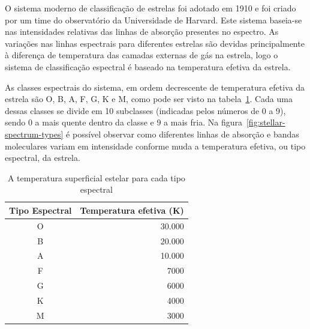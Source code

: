 O sistema moderno de classificação de estrelas foi adotado em 1910 e foi criado por um time do observatório da Universidade de Harvard. Este sistema baseia-se nas intensidades relativas das linhas de absorção presentes no espectro. As variações nas linhas espectrais para diferentes estrelas são devidas principalmente à diferença de temperatura das camadas externas de gás na estrela, logo o sistema de classificação espectral é baseado na temperatura efetiva da estrela. 

As classes espectrais do sistema, em ordem decrescente de temperatura efetiva da estrela são O, B, A, F, G, K e M, como pode ser visto na tabela~\ref{tab:stellar-temperatures}. Cada uma dessas classes se divide em 10 subclasses (indicadas pelos números de 0 a 9), sendo 0 a mais quente dentro da classe e 9 a mais fria.
Na figura~\ref{fig:stellar-spectrum-types} é possível observar como diferentes linhas de absorção e bandas moleculares variam em intensidade conforme muda a temperatura efetiva, ou tipo espectral, da estrela.

\begin{table}[htb]
\centering
\begin{tabular}{|c|r|}
\hline
\textbf{Tipo Espectral} & \textbf{Temperatura efetiva (K)} \\ \hline
O                       & 30.000                               \\ \hline
B                       & 20.000                               \\ \hline
A                       & 10.000                               \\ \hline
F                       & 7000                                 \\ \hline
G                       & 6000                                 \\ \hline
K                       & 4000                                 \\ \hline
M                       & 3000                                 \\ \hline
\end{tabular}
\caption{A temperatura superficial estelar para cada tipo espectral \citep{iag-stellar-temps}}\label{tab:stellar-temperatures}
\end{table}

